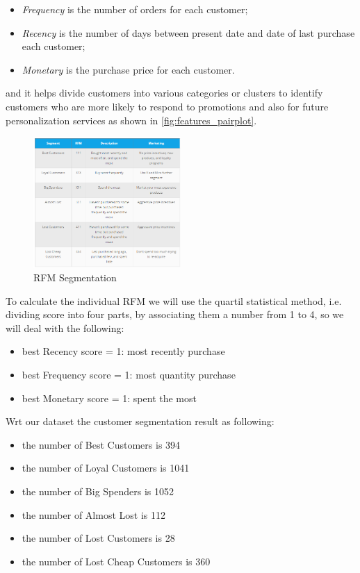 \begin{itemize}
\item \emph{Frequency} is the number of orders for each customer;
\item \emph{Recency} is the number of days between present date and date of last purchase each customer;
\item \emph{Monetary} is the purchase price for each customer.
\end{itemize}

and it helps divide customers into various categories or clusters to identify customers who are more likely to respond to promotions and also for future personalization services as shown in \ref{fig:features_pairplot}.

\begin{figure}[!h]
\centering
\includegraphics[width=0.5\textwidth]{img/preparation/rfm_seg.png}
\caption{RFM Segmentation}
\label{fig:dataset_corr}
\end{figure}

To calculate the individual RFM we will use the quartil statistical method, i.e. dividing score into four parts, by associating them a number from 1 to 4, so we will deal with the following:

\begin{itemize}
\item best Recency score = 1: most recently purchase
\item best Frequency score = 1: most quantity purchase
\item best Monetary score = 1: spent the most
\end{itemize}

Wrt our dataset the customer segmentation result as following:

\begin{itemize}
\item the number of Best Customers is 394
\item the number of Loyal Customers is 1041
\item the number of Big Spenders is 1052
\item the number of Almost Lost is 112
\item the number of Lost Customers is 28
\item the number of Lost Cheap Customers is 360
\end{itemize}

